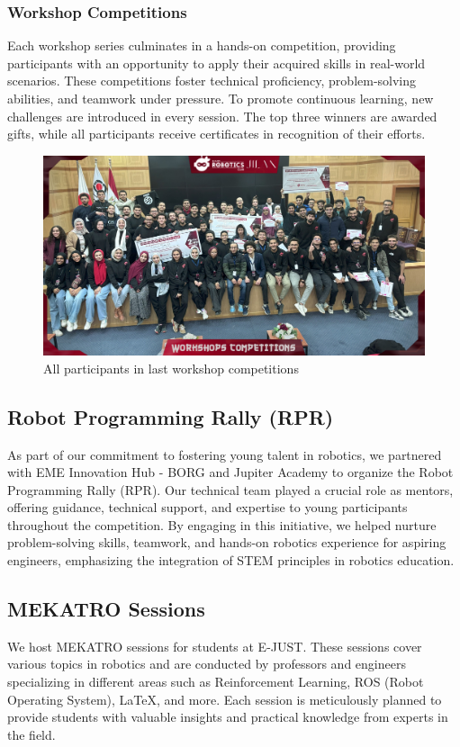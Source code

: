 \documentclass[11pt, twocolumn]{article}
\begin{document}
\subsubsection{Workshop Competitions}
Each workshop series culminates in a hands-on competition, providing participants with an opportunity to apply their acquired skills in real-world scenarios. These competitions foster technical proficiency, problem-solving abilities, and teamwork under pressure. To promote continuous learning, new challenges are introduced in every session. The top three winners are awarded gifts, while all participants receive certificates in recognition of their efforts.
\begin{figure}[h]
            \centering
            \includegraphics[width=0.65\linewidth]{Images/workshop competition.jpg}
           \caption{All participants in last workshop competitions}
            \label{fig:enter-label}
                \end{figure}







\newpage
\subsection{Robot Programming Rally (RPR)}
As part of our commitment to fostering young talent in robotics, we partnered with EME Innovation Hub - BORG and Jupiter Academy to organize the Robot Programming Rally (RPR). Our technical team played a crucial role as mentors, offering guidance, technical support, and expertise to young participants throughout the competition. By engaging in this initiative, we helped nurture problem-solving skills, teamwork, and hands-on robotics experience for aspiring engineers, emphasizing the integration of STEM principles in robotics education.

\subsection{MEKATRO Sessions}
We host MEKATRO sessions for students at E-JUST. These sessions cover various topics in robotics and are conducted by professors and engineers specializing in different areas such as Reinforcement Learning, ROS (Robot Operating System), LaTeX, and more. Each session is meticulously planned to provide students with valuable insights and practical knowledge from experts in the field.
\end{document}
